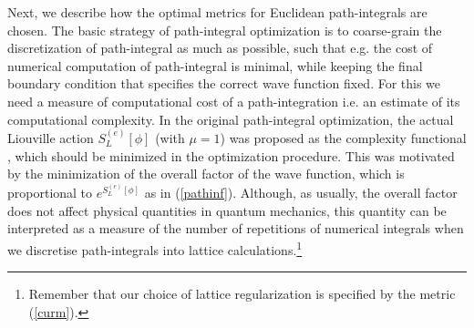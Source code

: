 \documentclass[a4paper,12pt]{article}
\begin{document}
Next, we describe how the optimal metrics for Euclidean path-integrals are chosen. The basic strategy of path-integral optimization is to coarse-grain the discretization of path-integral as much as possible, such that e.g. the cost of numerical computation of path-integral is minimal, while keeping the final boundary condition that specifies the correct wave function fixed.  For this we need a measure of computational cost of a path-integration i.e. an estimate of its computational complexity. In the original path-integral optimization, the actual Liouville action $S^{(e)}_L[\phi]$ (with $\mu=1$)  was proposed as the complexity functional \cite{Caputa:2017urj}, which should be minimized in the optimization procedure. This was motivated by the minimization of the overall factor of the wave function, which is proportional to $e^{S^{(e)}_L[\phi]}$ as in (\ref{pathinf}). Although, as usually, the overall factor does not affect physical quantities in quantum mechanics, this quantity can be interpreted as a measure of the number of repetitions of numerical integrals when we discretise path-integrals into lattice calculations.\footnote{Remember that our choice of lattice 
regularization is specified by the metric (\ref{curm}).} 
\end{document}
